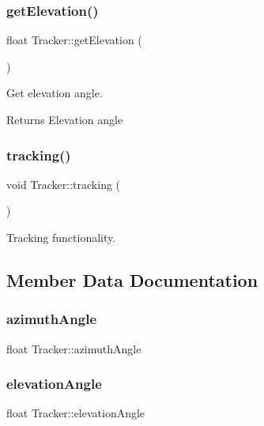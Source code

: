 \subsubsection{\texorpdfstring{get\+Elevation()}{getElevation()}}
{\footnotesize\ttfamily float Tracker\+::get\+Elevation (\begin{DoxyParamCaption}{ }\end{DoxyParamCaption})}



Get elevation angle. 

\begin{DoxyReturn}{Returns}
Elevation angle 
\end{DoxyReturn}
\mbox{\label{class_tracker_acef915ffe13cd44ca398e78a8ffae63e}} 
\subsubsection{\texorpdfstring{tracking()}{tracking()}}
{\footnotesize\ttfamily void Tracker\+::tracking (\begin{DoxyParamCaption}{ }\end{DoxyParamCaption})}



Tracking functionality. 



\subsection{Member Data Documentation}
\mbox{\label{class_tracker_abef36dbbea142e3f6e8fa599b03914e1}} 
\subsubsection{\texorpdfstring{azimuth\+Angle}{azimuthAngle}}
{\footnotesize\ttfamily float Tracker\+::azimuth\+Angle\hspace{0.3cm}{\ttfamily [private]}}

\mbox{\label{class_tracker_aed5b4c7d6d46607fefac6b1df2d41e18}} 
\subsubsection{\texorpdfstring{elevation\+Angle}{elevationAngle}}
{\footnotesize\ttfamily float Tracker\+::elevation\+Angle\hspace{0.3cm}{\ttfamily [private]}}

